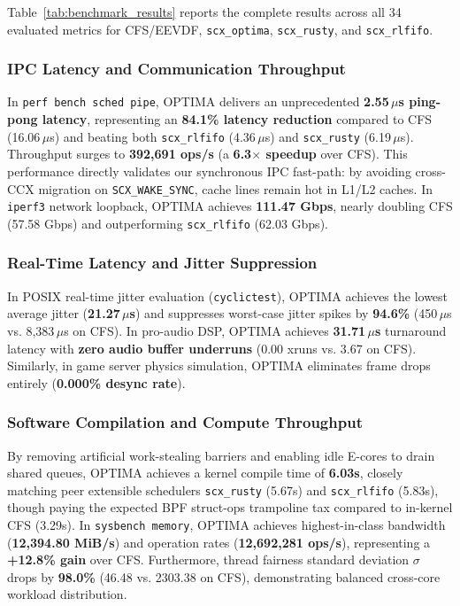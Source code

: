 \documentclass[conference]{IEEEtran}
\begin{document}
Table~\ref{tab:benchmark_results} reports the complete results across all 34 evaluated metrics for CFS/EEVDF, \texttt{scx\_optima}, \texttt{scx\_rusty}, and \texttt{scx\_rlfifo}.

\subsubsection{IPC Latency and Communication Throughput}
In \texttt{perf bench sched pipe}, OPTIMA delivers an unprecedented \textbf{2.55\,$\mu$s ping-pong latency}, representing an \textbf{84.1\% latency reduction} compared to CFS (16.06\,$\mu$s) and beating both \texttt{scx\_rlfifo} (4.36\,$\mu$s) and \texttt{scx\_rusty} (6.19\,$\mu$s). Throughput surges to \textbf{392,691 ops/s} (a \textbf{6.3$\times$ speedup} over CFS). This performance directly validates our synchronous IPC fast-path: by avoiding cross-CCX migration on \texttt{SCX\_WAKE\_SYNC}, cache lines remain hot in L1/L2 caches. In \texttt{iperf3} network loopback, OPTIMA achieves \textbf{111.47 Gbps}, nearly doubling CFS (57.58 Gbps) and outperforming \texttt{scx\_rlfifo} (62.03 Gbps).

\subsubsection{Real-Time Latency and Jitter Suppression}
In POSIX real-time jitter evaluation (\texttt{cyclictest}), OPTIMA achieves the lowest average jitter (\textbf{21.27\,$\mu$s}) and suppresses worst-case jitter spikes by \textbf{94.6\%} (450\,$\mu$s vs. 8,383\,$\mu$s on CFS). In pro-audio DSP, OPTIMA achieves \textbf{31.71\,$\mu$s} turnaround latency with \textbf{zero audio buffer underruns} (0.00 xruns vs. 3.67 on CFS). Similarly, in game server physics simulation, OPTIMA eliminates frame drops entirely (\textbf{0.000\% desync rate}).

\subsubsection{Software Compilation and Compute Throughput}
By removing artificial work-stealing barriers and enabling idle E-cores to drain shared queues, OPTIMA achieves a kernel compile time of \textbf{6.03s}, closely matching peer extensible schedulers \texttt{scx\_rusty} (5.67s) and \texttt{scx\_rlfifo} (5.83s), though paying the expected BPF struct-ops trampoline tax compared to in-kernel CFS (3.29s). In \texttt{sysbench memory}, OPTIMA achieves highest-in-class bandwidth (\textbf{12,394.80 MiB/s}) and operation rates (\textbf{12,692,281 ops/s}), representing a \textbf{+12.8\% gain} over CFS. Furthermore, thread fairness standard deviation $\sigma$ drops by \textbf{98.0\%} (46.48 vs. 2303.38 on CFS), demonstrating balanced cross-core workload distribution.
\end{document}
